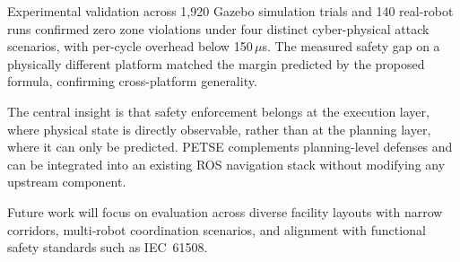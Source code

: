 \documentclass[conference]{IEEEtran}
\begin{document}
Experimental validation across 1{,}920 Gazebo simulation trials and 140 real-robot runs confirmed zero zone violations under four distinct cyber-physical attack scenarios, with per-cycle overhead below 150\,$\mu$s. The measured safety gap on a physically different platform matched the margin predicted by the proposed formula, confirming cross-platform generality.

The central insight is that safety enforcement belongs at the execution layer, where physical state is directly observable, rather than at the planning layer, where it can only be predicted. PETSE complements planning-level defenses and can be integrated into an existing ROS navigation stack without modifying any upstream component.

Future work will focus on evaluation across diverse facility layouts with narrow corridors, multi-robot coordination scenarios, and alignment with functional safety standards such as IEC~61508.



\end{document}
